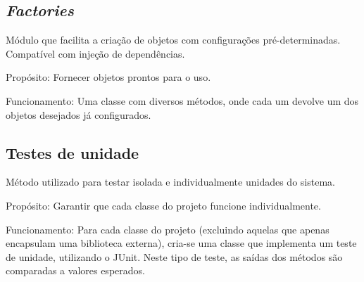 \documentclass[11pt, a4paper]{article}
\begin{document}
        \subsection{\textit{Factories}}
            Módulo que facilita a criação de objetos com configurações
            pré-determinadas. Compatível com injeção de dependências.

            Propósito: Fornecer objetos prontos para o uso.

            Funcionamento: Uma classe com diversos métodos, onde cada um
			devolve um dos objetos desejados já configurados.

        \subsection{Testes de unidade}
            Método utilizado para testar isolada e individualmente unidades do sistema.

            Propósito: Garantir que cada classe do projeto funcione individualmente.

            Funcionamento: Para cada classe do projeto (excluindo aquelas que 
			apenas encapsulam uma biblioteca externa), cria-se uma classe que implementa um teste de unidade,  utilizando o JUnit. Neste tipo de teste, as saídas dos métodos são comparadas a valores esperados.
        
\end{document}
